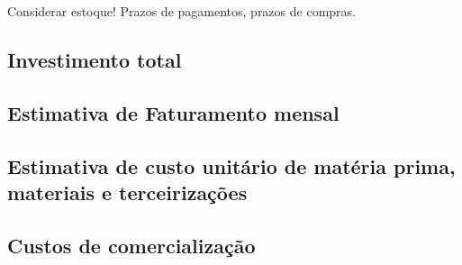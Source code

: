 Considerar estoque!
Prazos de pagamentos, prazos de compras.

\subsection{Investimento total}

\subsection{Estimativa de Faturamento mensal}

\subsection{Estimativa de custo unitário de matéria prima, materiais e terceirizações}

\subsection{Custos de comercialização}